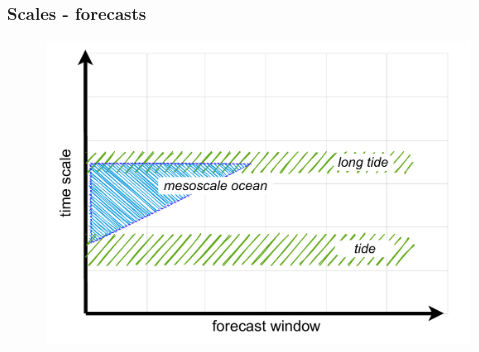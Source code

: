 \begin{frame}
\frametitle{Scales - forecasts}
    \begin{figure}      
     \includegraphics[height=\textheight]{figures/diagrams/scales_focus.pdf}
    \end{figure} 
\end{frame}

